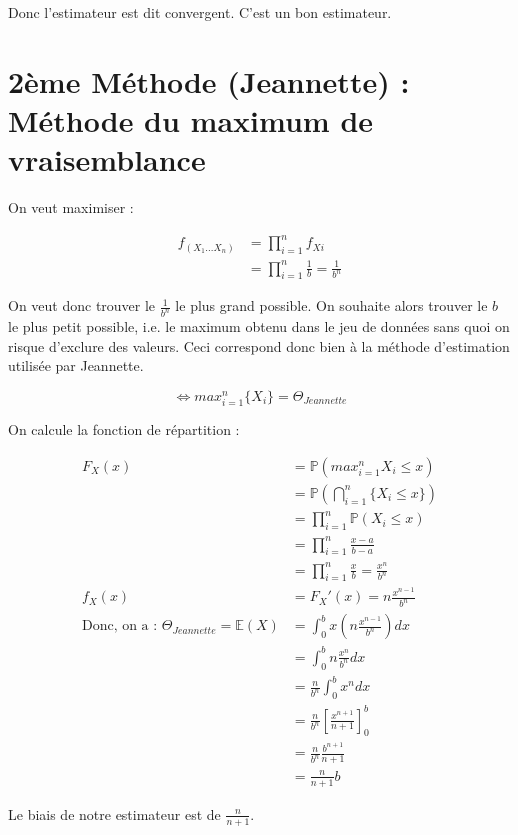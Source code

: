 \documentclass{article}
\begin{document}
Donc l'estimateur est dit convergent. C'est un bon estimateur.

\section{2ème Méthode (Jeannette) : Méthode du maximum de vraisemblance}

On veut maximiser :

\begin{equation}
    \begin{aligned}
        f_{(X_1...X_n)}&=\prod_{i=1}^{n}f_{Xi}\\
        &=\prod_{i=1}^{n}\frac{1}{b}=\frac{1}{b^n}
    \end{aligned}
\end{equation}

On veut donc trouver le $\frac{1}{b^n}$ le plus grand possible. On souhaite alors trouver le $b$ le plus petit possible, i.e. le maximum obtenu dans le jeu de données sans quoi on risque d'exclure des valeurs. Ceci correspond donc bien à la méthode d'estimation utilisée par Jeannette.

$$
\Leftrightarrow max_{i=1}^n \{X_i\} = \Theta_{Jeannette}
$$

On calcule la fonction de répartition :

\begin{equation}
    \begin{aligned}
        F_X(x)&=\mathbb{P}(max_{i=1}^nX_i\leq x)\\
        &=\mathbb{P}(\bigcap_{i=1}^n\{X_i\leq x\})\\
        &=\prod_{i=1}^n\mathbb{P}(X_i\leq x)\\
        &=\prod_{i=1}^n \frac{x-a}{b-a}\\
        &=\prod_{i=1}^n \frac{x}{b}=\frac{x^n}{b^n}\\
        f_X(x)&=F_X'(x)=n\frac{x^{n-1}}{b^n}\\
        \text{Donc, on a : }\Theta_{Jeannette}=\mathbb{E}(X)&=\int_0^b x(n\frac{x^{n-1}}{b^n})dx\\
        &=\int_0^b n\frac{x^n}{b^n}dx\\
        &=\frac{n}{b^n}\int_0^b x^ndx\\
        &=\frac{n}{b^n}[\frac{x^{n+1}}{n+1}]_0^b\\
        &=\frac{n}{b^n}\frac{b^{n+1}}{n+1}\\
        &=\frac{n}{n+1}b
    \end{aligned}
\end{equation}

Le biais de notre estimateur est de $\frac{n}{n+1}$.
\end{document}
